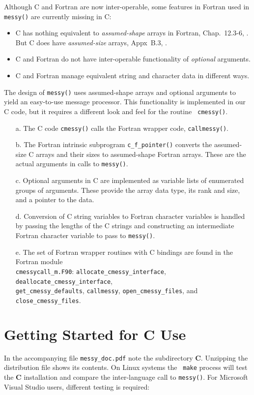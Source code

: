 \documentclass[12pt]{article}
\begin{document}
Although C and Fortran are now inter-operable, some features in Fortran used in
{\tt messy()} are currently missing in C:
\begin{itemize}\setlength{\itemsep}{-2pt}
\item C has nothing equivalent to {\em assumed-shape} arrays in Fortran,
  Chap.~12.3-6, \cite{Metcalf:2004:FE}.  But C does have {\em assumed-size}
  arrays,  Appx~B.3, \cite{Metcalf:2004:FE}.
\item C and Fortran do not have inter-operable functionality of {\em optional}
  arguments.
\item C and Fortran manage equivalent string and character data in different ways. 
\end{itemize}
The design of {\tt messy()} uses assumed-shape arrays and optional arguments to
yield an easy-to-use message processor.  This functionality is implemented in
our C code, but it requires a different look and feel for the routine {\tt
  cmessy()}.
\begin{itemize}\setlength{\itemsep}{-2pt}
\item[a.] The C code {\tt cmessy()} calls the  Fortran wrapper code, {\tt callmessy()}.
\item[b.] The Fortran intrinsic subprogram {\tt c\_f\_pointer()} converts the
  assumed-size C arrays and their sizes to assumed-shape Fortran arrays.  These
  are the actual arguments in calls to {\tt messy()}.
\item[c.] Optional arguments in C are implemented as variable lists of
  enumerated groups of arguments.  These provide the array data type, its rank
  and size, and a pointer to the data.
\item[d.] Conversion of C string variables to Fortran character variables is
  handled by passing the lengths of the C strings and constructing an
  intermediate Fortran character variable to pass to {\tt messy()}.
\item[e.] The set of Fortran wrapper routines with C bindings are
  found in the Fortran module\\
{\tt cmessycall\_m.F90}: {\tt allocate\_cmessy\_interface}, {\tt
  deallocate\_cmessy\_interface},\\ 
  {\tt get\_cmessy\_defaults}, {\tt callmessy}, {\tt open\_cmessy\_files}, and
  {\tt close\_cmessy\_files}.
\end{itemize}


\section{Getting Started for C Use}
In the accompanying file {\tt messy\_doc.pdf} note the subdirectory {\bf C}.
Unzipping the distribution file shows its contents.  On Linux systems the {\tt
  make} process will test the {\bf C} installation and compare the
inter-language call to {\tt messy()}.  For Microsoft Visual Studio users,
different testing is required:
\end{document}
